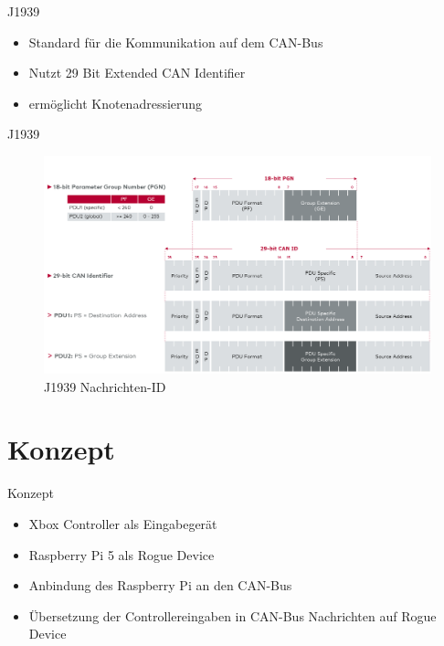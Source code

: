 \documentclass[usenames, dvipsnames, aspectratio=75]{beamer}
\begin{document}
\begin{frame}{J1939}
    \begin{itemize}
        \item Standard für die Kommunikation auf dem CAN-Bus
        \item Nutzt 29 Bit Extended CAN Identifier
        \item ermöglicht Knotenadressierung
    \end{itemize}
\end{frame}

\begin{frame}{J1939}
    \begin{figure}
        \centering
        \includegraphics[width=1\linewidth]{assets/j1939id.png}
        \caption{J1939 Nachrichten-ID}
    \end{figure}
\end{frame}


\section{Konzept}
\begin{frame}{Konzept}
    \begin{itemize}
        \item Xbox Controller als Eingabegerät
        \item Raspberry Pi 5 als Rogue Device
        \item Anbindung des Raspberry Pi an den CAN-Bus
        \item Übersetzung der Controllereingaben in CAN-Bus Nachrichten auf Rogue Device
    \end{itemize}
\end{frame}
\end{document}
